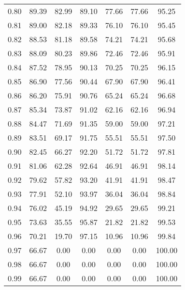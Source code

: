 \begin{tabular}{|c|c|c|c|c|c|c|}
      0.80 &     89.39 &     82.99 &      89.10 &   77.66 &      77.66 &         95.25 \\
      0.81 &     89.00 &     82.18 &      89.33 &   76.10 &      76.10 &         95.45 \\
      0.82 &     88.53 &     81.18 &      89.58 &   74.21 &      74.21 &         95.68 \\
      0.83 &     88.09 &     80.23 &      89.86 &   72.46 &      72.46 &         95.91 \\
      0.84 &     87.52 &     78.95 &      90.13 &   70.25 &      70.25 &         96.15 \\
      0.85 &     86.90 &     77.56 &      90.44 &   67.90 &      67.90 &         96.41 \\
      0.86 &     86.20 &     75.91 &      90.76 &   65.24 &      65.24 &         96.68 \\
      0.87 &     85.34 &     73.87 &      91.02 &   62.16 &      62.16 &         96.94 \\
      0.88 &     84.47 &     71.69 &      91.35 &   59.00 &      59.00 &         97.21 \\
      0.89 &     83.51 &     69.17 &      91.75 &   55.51 &      55.51 &         97.50 \\
      0.90 &     82.45 &     66.27 &      92.20 &   51.72 &      51.72 &         97.81 \\
      0.91 &     81.06 &     62.28 &      92.64 &   46.91 &      46.91 &         98.14 \\
      0.92 &     79.62 &     57.82 &      93.20 &   41.91 &      41.91 &         98.47 \\
      0.93 &     77.91 &     52.10 &      93.97 &   36.04 &      36.04 &         98.84 \\
      0.94 &     76.02 &     45.19 &      94.92 &   29.65 &      29.65 &         99.21 \\
      0.95 &     73.63 &     35.55 &      95.87 &   21.82 &      21.82 &         99.53 \\
      0.96 &     70.21 &     19.70 &      97.15 &   10.96 &      10.96 &         99.84 \\
      0.97 &     66.67 &      0.00 &       0.00 &    0.00 &       0.00 &        100.00 \\
      0.98 &     66.67 &      0.00 &       0.00 &    0.00 &       0.00 &        100.00 \\
      0.99 &     66.67 &      0.00 &       0.00 &    0.00 &       0.00 &        100.00 \\
\bottomrule
\end{tabular}
